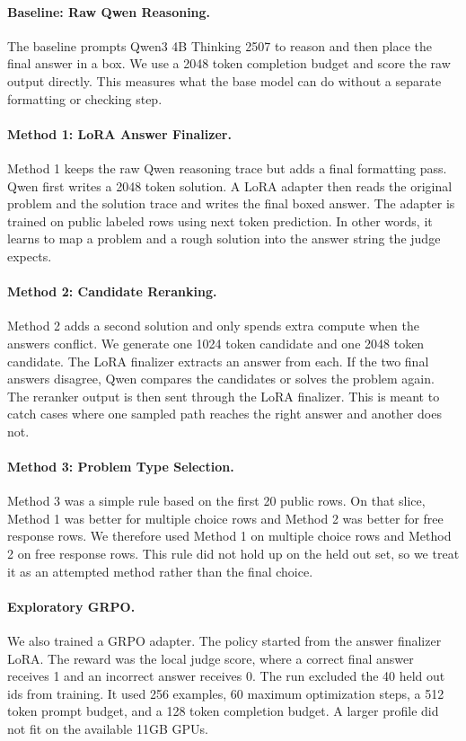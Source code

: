 \documentclass[11pt]{article}
\begin{document}
\paragraph{Baseline: Raw Qwen Reasoning.}
The baseline prompts Qwen3 4B Thinking 2507 to reason and then place the final answer in a box. We use a 2048 token completion budget and score the raw output directly. This measures what the base model can do without a separate formatting or checking step.

\paragraph{Method 1: LoRA Answer Finalizer.}
Method 1 keeps the raw Qwen reasoning trace but adds a final formatting pass. Qwen first writes a 2048 token solution. A LoRA adapter then reads the original problem and the solution trace and writes the final boxed answer. The adapter is trained on public labeled rows using next token prediction. In other words, it learns to map a problem and a rough solution into the answer string the judge expects.

\paragraph{Method 2: Candidate Reranking.}
Method 2 adds a second solution and only spends extra compute when the answers conflict. We generate one 1024 token candidate and one 2048 token candidate. The LoRA finalizer extracts an answer from each. If the two final answers disagree, Qwen compares the candidates or solves the problem again. The reranker output is then sent through the LoRA finalizer. This is meant to catch cases where one sampled path reaches the right answer and another does not.

\paragraph{Method 3: Problem Type Selection.}
Method 3 was a simple rule based on the first 20 public rows. On that slice, Method 1 was better for multiple choice rows and Method 2 was better for free response rows. We therefore used Method 1 on multiple choice rows and Method 2 on free response rows. This rule did not hold up on the held out set, so we treat it as an attempted method rather than the final choice.

\paragraph{Exploratory GRPO.}
We also trained a GRPO adapter. The policy started from the answer finalizer LoRA. The reward was the local judge score, where a correct final answer receives 1 and an incorrect answer receives 0. The run excluded the 40 held out ids from training. It used 256 examples, 60 maximum optimization steps, a 512 token prompt budget, and a 128 token completion budget. A larger profile did not fit on the available 11GB GPUs.
\end{document}
